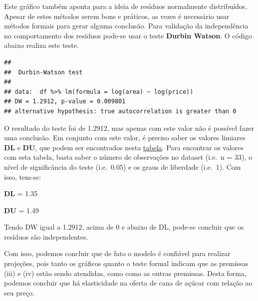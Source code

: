 \documentclass[
  12pt,
  a4paper,
]{article}
\begin{document}
Este gráfico também aponta para a ideia de resíduos normalmente distribuídos. Apesar de estes métodos serem bons e práticos, as vezes é necessário usar métodos formais para gerar alguma conclusão. Para validação da independência no comportamento dos resíduos pode-se usar o teste \textbf{Durbin Watson}. O código abaixo realiza este teste.

\begin{verbatim}
## 
##  Durbin-Watson test
## 
## data:  df %>% lm(formula = log(area) ~ log(price))
## DW = 1.2912, p-value = 0.009801
## alternative hypothesis: true autocorrelation is greater than 0
\end{verbatim}

O resultado do teste foi de 1.2912, mas apenas com este valor não é possível fazer uma conclusão. Em conjunto com este valor, é preciso saber os valores limiares \textbf{DL} e \textbf{DU}, que podem ser encontrados nesta \href{http://www.portalaction.com.br/analise-de-regressao/33-diagnostico-de-independencia}{tabela}. Para encontrar os valores com esta tabela, basta saber o número de observações no dataset (i.e.~n = 33), o nível de significância do teste (i.e.~0.05) e os graus de liberdade (i.e.~1). Com isso, tem-se:

\textbf{DL} = 1.35

\textbf{DU} = 1.49

Tendo DW igual a 1.2912, acima de 0 e abaixo de DL, pode-se concluir que os resíduos são independentes.

Com isso, podemos concluir que de fato o modelo é confiável para realizar projeções, pois tanto os gráficos quanto o teste formal indicam que as premissas (iii) e (iv) estão sendo atendidas, como como as outras premissas. Desta forma, podemos concluir que há elasticidade na oferta de cana de açúcar com relação ao seu preço.
\end{document}
